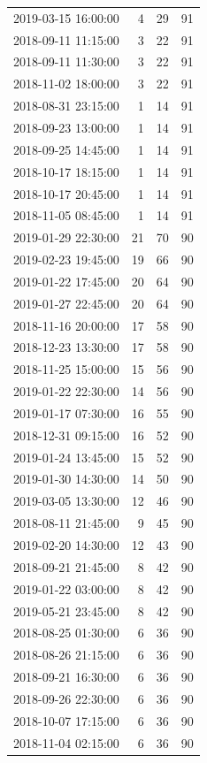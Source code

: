 \begin{tabular}{lrrr}
2019-03-15 16:00:00 & 4 & 29 & 91 \\
2018-09-11 11:15:00 & 3 & 22 & 91 \\
2018-09-11 11:30:00 & 3 & 22 & 91 \\
2018-11-02 18:00:00 & 3 & 22 & 91 \\
2018-08-31 23:15:00 & 1 & 14 & 91 \\
2018-09-23 13:00:00 & 1 & 14 & 91 \\
2018-09-25 14:45:00 & 1 & 14 & 91 \\
2018-10-17 18:15:00 & 1 & 14 & 91 \\
2018-10-17 20:45:00 & 1 & 14 & 91 \\
2018-11-05 08:45:00 & 1 & 14 & 91 \\
2019-01-29 22:30:00 & 21 & 70 & 90 \\
2019-02-23 19:45:00 & 19 & 66 & 90 \\
2019-01-22 17:45:00 & 20 & 64 & 90 \\
2019-01-27 22:45:00 & 20 & 64 & 90 \\
2018-11-16 20:00:00 & 17 & 58 & 90 \\
2018-12-23 13:30:00 & 17 & 58 & 90 \\
2018-11-25 15:00:00 & 15 & 56 & 90 \\
2019-01-22 22:30:00 & 14 & 56 & 90 \\
2019-01-17 07:30:00 & 16 & 55 & 90 \\
2018-12-31 09:15:00 & 16 & 52 & 90 \\
2019-01-24 13:45:00 & 15 & 52 & 90 \\
2019-01-30 14:30:00 & 14 & 50 & 90 \\
2019-03-05 13:30:00 & 12 & 46 & 90 \\
2018-08-11 21:45:00 & 9 & 45 & 90 \\
2019-02-20 14:30:00 & 12 & 43 & 90 \\
2018-09-21 21:45:00 & 8 & 42 & 90 \\
2019-01-22 03:00:00 & 8 & 42 & 90 \\
2019-05-21 23:45:00 & 8 & 42 & 90 \\
2018-08-25 01:30:00 & 6 & 36 & 90 \\
2018-08-26 21:15:00 & 6 & 36 & 90 \\
2018-09-21 16:30:00 & 6 & 36 & 90 \\
2018-09-26 22:30:00 & 6 & 36 & 90 \\
2018-10-07 17:15:00 & 6 & 36 & 90 \\
2018-11-04 02:15:00 & 6 & 36 & 90 \\

\end{tabular}
